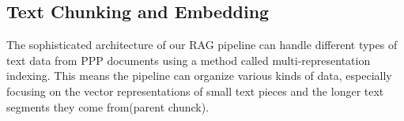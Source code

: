 \subsection{Text Chunking and Embedding}
The sophisticated architecture of our RAG pipeline can handle different types of text data from PPP documents using a method called multi-representation indexing. This means the pipeline can organize various kinds of data, especially focusing on the vector representations of small text pieces and the longer text segments they come from(parent chunck).
\vskip 0.5cm
